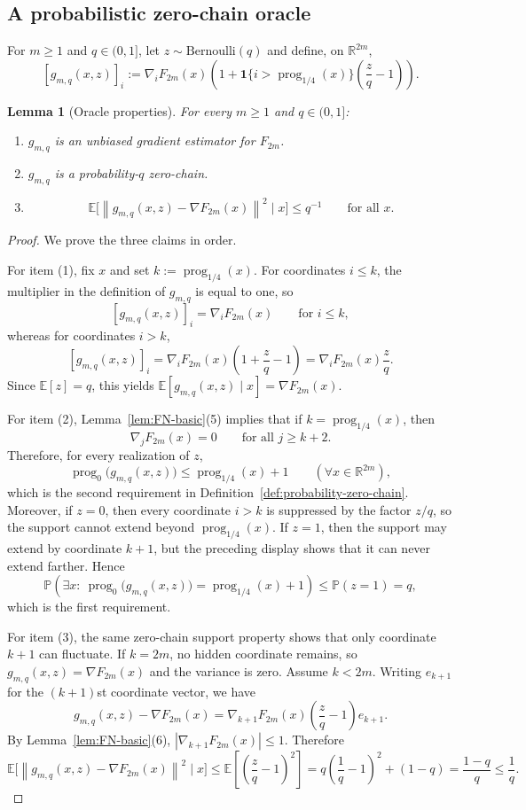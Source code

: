 \documentclass[11pt]{article}
\newtheorem{lemma}[theorem]{Lemma}
\newcommand{\R}{\mathbb{R}}
\newcommand{\E}{\mathbb{E}}
\newcommand{\Pbb}{\mathbb{P}}
\newcommand{\norm}[1]{\left\lVert #1\right\rVert}
\newcommand{\prog}{\operatorname{prog}}
\begin{document}
\subsection{A probabilistic zero-chain oracle}
\label{app:sto-oracle}

For $m\ge 1$ and $q\in(0,1]$, let $z\sim \mathrm{Bernoulli}(q)$ and define, on $\R^{2m}$,
\[
[g_{m,q}(x,z)]_i
:=
\nabla_i F_{2m}(x)\left(1+\mathbf 1\{i>\prog_{1/4}(x)\}\left(\frac{z}{q}-1\right)\right).
\]

\begin{lemma}[Oracle properties]
\label{lem:oracle-properties}
For every $m\ge 1$ and $q\in(0,1]$:
\begin{enumerate}[label=\arabic*.,leftmargin=1.5em]
    \item $g_{m,q}$ is an unbiased gradient estimator for $F_{2m}$.
    \item $g_{m,q}$ is a probability-$q$ zero-chain.
    \item
    \[
    \E\bigl[\norm{g_{m,q}(x,z)-\nabla F_{2m}(x)}^2\mid x\bigr]\le q^{-1}
    \qquad
    \text{for all }x.
    \]
\end{enumerate}
\end{lemma}

\begin{proof}
We prove the three claims in order.

For item (1), fix $x$ and set $k:=\prog_{1/4}(x)$.
For coordinates \(i\le k\), the multiplier in the definition of \(g_{m,q}\) is equal to one, so
\[
[g_{m,q}(x,z)]_i=\nabla_i F_{2m}(x)
\qquad
\text{for }i\le k,
\]
whereas for coordinates \(i>k\),
\[
[g_{m,q}(x,z)]_i
=
\nabla_i F_{2m}(x)\left(1+\frac{z}{q}-1\right)
=
\nabla_i F_{2m}(x)\frac{z}{q}.
\]
Since $\E[z]=q$, this yields $\E[g_{m,q}(x,z)\mid x]=\nabla F_{2m}(x)$.

For item (2), Lemma~\ref{lem:FN-basic}(5) implies that if $k=\prog_{1/4}(x)$, then
\[
\nabla_j F_{2m}(x)=0
\qquad
\text{for all }j\ge k+2.
\]
Therefore, for every realization of $z$,
\[
\prog_0\bigl(g_{m,q}(x,z)\bigr)\le \prog_{1/4}(x)+1
\qquad
(\forall x\in\R^{2m}),
\]
which is the second requirement in Definition~\ref{def:probability-zero-chain}.
Moreover, if $z=0$, then every coordinate \(i>k\) is suppressed by the factor \(z/q\), so the support cannot extend
beyond $\prog_{1/4}(x)$. If $z=1$, then the support may extend by coordinate \(k+1\), but the preceding display shows
that it can never extend farther.
Hence
\[
\Pbb\!\left(\exists x:\ \prog_0\bigl(g_{m,q}(x,z)\bigr)=\prog_{1/4}(x)+1\right)\le \Pbb(z=1)=q,
\]
which is the first requirement.

For item (3), the same zero-chain support property shows that only coordinate $k+1$ can fluctuate.
If \(k=2m\), no hidden coordinate remains, so \(g_{m,q}(x,z)=\nabla F_{2m}(x)\) and the variance is zero.
Assume \(k<2m\).
Writing $e_{k+1}$ for the $(k+1)$st coordinate vector, we have
\[
g_{m,q}(x,z)-\nabla F_{2m}(x)
=
\nabla_{k+1}F_{2m}(x)\left(\frac{z}{q}-1\right)e_{k+1}.
\]
By Lemma~\ref{lem:FN-basic}(6), $|\nabla_{k+1}F_{2m}(x)|\le 1$.
Therefore
\[
\E\bigl[\norm{g_{m,q}(x,z)-\nabla F_{2m}(x)}^2\mid x\bigr]
\le
\E\left[\left(\frac{z}{q}-1\right)^2\right]
=
q\left(\frac{1}{q}-1\right)^2+(1-q)
=
\frac{1-q}{q}
\le
\frac{1}{q}.
\]
\end{proof}
\end{document}
